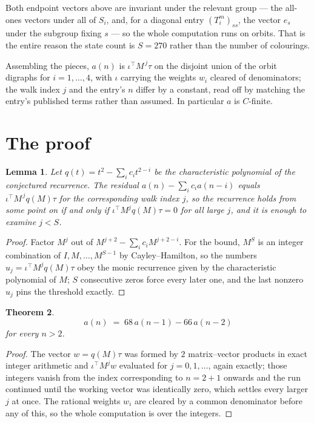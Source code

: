 \documentclass[11pt,a4paper]{article}
\theoremstyle{plain}
\newtheorem{theorem}{Theorem}
\newtheorem{lemma}[theorem]{Lemma}
\theoremstyle{definition}
\begin{document}
Both endpoint vectors above are invariant under the relevant group --- the all-ones vectors
under all of $S_i$, and, for a diagonal entry $(T_i^m)_{ss}$, the vector $e_s$ under the
subgroup fixing $s$ --- so the whole computation runs on orbits. That is the entire reason the
state count is $S=270$ rather than the number of colourings.

Assembling the pieces, $a(n)$ is $\iota^{\!\top}M^{\,j}\tau$ on the disjoint union of the
orbit digraphs for $i=1,\dots,4$, with $\iota$ carrying the weights $w_i$ cleared of
denominators; the walk index $j$ and the entry's $n$ differ by a constant, read off by
matching the entry's published terms rather than assumed. In particular $a$ is $C$-finite.

\section{The proof}

\begin{lemma}\label{lem:crit}
Let $q(t)=t^{2}-\sum_i c_it^{2-i}$ be the characteristic polynomial of the
conjectured recurrence. The residual $a(n)-\sum_ic_ia(n-i)$ equals
$\iota^{\!\top}M^{\,j}q(M)\tau$ for the corresponding walk index $j$, so the recurrence
holds from some point on if and only if $\iota^{\!\top}M^{j}q(M)\tau=0$ for all large $j$,
and it is enough to examine $j<S$.
\end{lemma}

\begin{proof}
Factor $M^{j}$ out of $M^{j+2}-\sum_ic_iM^{j+2-i}$. For the bound, $M^{S}$
is an integer combination of $I,M,\dots,M^{S-1}$ by Cayley--Hamilton, so the numbers
$u_j=\iota^{\!\top}M^{j}q(M)\tau$ obey the monic recurrence given by the characteristic
polynomial of $M$; $S$ consecutive zeros force every later one, and the last nonzero $u_j$
pins the threshold exactly.
\end{proof}

\begin{theorem}
\[
a(n)\;=\;68\,a(n-1) - 66\,a(n-2)
\]
for every $n>2$.
\end{theorem}

\begin{proof}
The vector $w=q(M)\tau$ was formed by $2$ matrix--vector products in exact integer
arithmetic and $\iota^{\!\top}M^{j}w$ evaluated for $j=0,1,\dots$, again exactly; those
integers vanish from the index corresponding to $n=2+1$ onwards and the run continued
until the working vector was identically zero, which settles every larger $j$ at once. The
rational weights $w_i$ are cleared by a common denominator before any of this, so the whole
computation is over the integers.
\end{proof}
\end{document}
